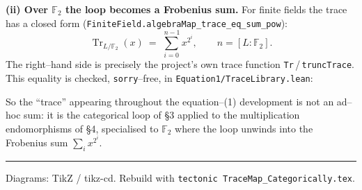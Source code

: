 \documentclass[11pt]{article}
\newcommand{\Tr}{\operatorname{Tr}}
\newcommand{\tr}{\operatorname{tr}}
\begin{document}
\medskip
\noindent\textbf{(ii) Over $\mathbb{F}_2$ the loop becomes a Frobenius sum.}
For finite fields the trace has a closed form
(\texttt{FiniteField.algebraMap\_trace\_eq\_sum\_pow}):
\[
\Tr_{L/\mathbb{F}_2}(x)\ =\ \sum_{i=0}^{\,n-1} x^{2^{i}},
\qquad n=[L:\mathbb{F}_2].
\]
The right--hand side is precisely the project's own trace function
\texttt{Tr}\,/\,\texttt{truncTrace}. This equality is checked, \texttt{sorry}--free,
in \texttt{Equation1/TraceLibrary.lean}:

\begin{center}
\end{center}

\medskip
So the ``trace'' appearing throughout the equation--(1) development is not an
ad--hoc sum: it is the categorical loop of \S3 applied to the multiplication
endomorphisms of \S4, specialised to $\mathbb{F}_2$ where the loop unwinds into
the Frobenius sum $\sum_i x^{2^i}$.

\vfill
\hrule
\begin{center}\small
Diagrams: TikZ / tikz-cd. Rebuild with \texttt{tectonic TraceMap\_Categorically.tex}.
\end{center}
\end{document}
